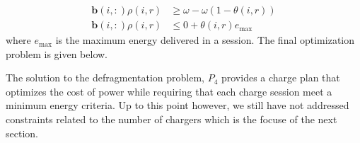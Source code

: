 \begin{equation}\label{eqn:defragmentation:fragmented}\begin{aligned}
	\mathbf{b}(i,:)\rho(i,r) &\ge \omega - \omega(1 - \theta(i,r)) \\
	\mathbf{b}(i,:)\rho(i,r) &\le 0 + \theta(i,r)e_{\text{max}}
\end{aligned}\end{equation}
where $e_{\text{max}}$ is the maximum energy delivered in a session.  The final optimization problem is given below.\\[0.1in]
\par The solution to the defragmentation problem, $P_4$ provides a charge plan that optimizes the cost of power while requiring that each charge session meet a minimum energy criteria. Up to this point however, we still have not addressed constraints related to the number of chargers which is the focuse of the next section.
